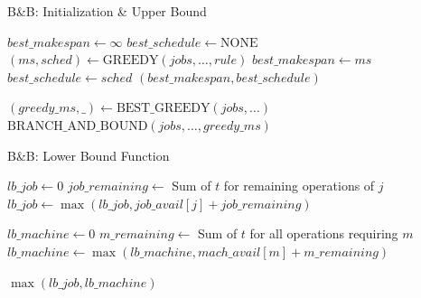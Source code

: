 \documentclass{beamer}
\begin{document}
\begin{frame}{B\&B: Initialization \& Upper Bound}
    \scriptsize
    \begin{algorithmic}[1]
            \State $best\_makespan \leftarrow \infty$
            \State $best\_schedule \leftarrow \text{NONE}$
                \State $(ms, sched) \leftarrow \text{GREEDY}(jobs, \dots, rule)$
                    \State $best\_makespan \leftarrow ms$
                    \State $best\_schedule \leftarrow sched$
                \EndIf
            \EndFor
            \State \Return $(best\_makespan, best\_schedule)$
        \EndFunction
        
        \Statex
        
            \State $(greedy\_ms, \_) \leftarrow \text{BEST\_GREEDY}(jobs, \dots)$
            \State \Return $\text{BRANCH\_AND\_BOUND}(jobs, \dots, greedy\_ms)$
        \EndFunction
    \end{algorithmic}
\end{frame}

\begin{frame}{B\&B: Lower Bound Function}
    \scriptsize
    \begin{algorithmic}[1]
            \State $lb\_job \leftarrow 0$
                \State $job\_remaining \leftarrow$ Sum of $t$ for remaining operations of $j$
                \State $lb\_job \leftarrow \max(lb\_job, job\_avail[j] + job\_remaining)$
            \EndFor
            
            \Statex
            
            \State $lb\_machine \leftarrow 0$
                \State $m\_remaining \leftarrow$ Sum of $t$ for all operations requiring $m$
                \State $lb\_machine \leftarrow \max(lb\_machine, mach\_avail[m] + m\_remaining)$
            \EndFor
            
            \State \Return $\max(lb\_job, lb\_machine)$
        \EndFunction
    \end{algorithmic}
\end{frame}
\end{document}
